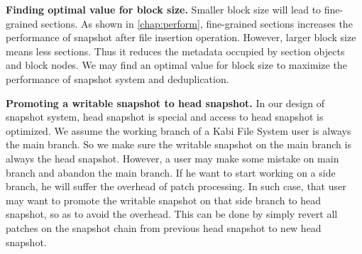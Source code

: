     \textbf{Finding optimal value for block size.} Smaller block size will lead to fine-grained sections. As shown in \cref{chap:perform}, fine-grained sections increases the performance of snapshot after file insertion operation. However, larger block size means less sections. Thus it reduces the metadata occupied by section objects and block nodes. We may find an optimal value for block size to maximize the performance of snapshot system and deduplication.

    \textbf{Promoting a writable snapshot to head snapshot.} In our design of snapshot system, head snapshot is special and access to head snapshot is optimized. We assume the working branch of a Kabi File System user is always the main branch. So we make sure the writable snapshot on the main branch is always the head snapshot. However, a user may make some mistake on main branch and abandon the main branch. If he want to start working on a side branch, he will suffer the overhead of patch processing. In such case, that user may want to promote the writable snapshot on that side branch to head snapshot, so as to avoid the overhead. This can be done by simply revert all patches on the snapshot chain from previous head snapshot to new head snapshot.
